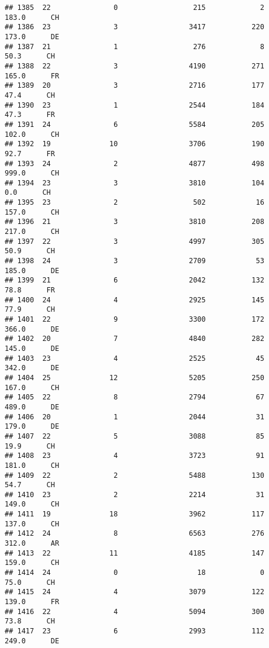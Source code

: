 \documentclass[
]{article}
\begin{document}
\begin{verbatim}
## 1385  22               0                  215             2    183.0      CH
## 1386  23               3                 3417           220    173.0      DE
## 1387  21               1                  276             8     50.3      CH
## 1388  22               3                 4190           271    165.0      FR
## 1389  20               3                 2716           177     47.4      CH
## 1390  23               1                 2544           184     47.3      FR
## 1391  24               6                 5584           205    102.0      CH
## 1392  19              10                 3706           190     92.7      FR
## 1393  24               2                 4877           498    999.0      CH
## 1394  23               3                 3810           104      0.0      CH
## 1395  23               2                  502            16    157.0      CH
## 1396  21               3                 3810           208    217.0      CH
## 1397  22               3                 4997           305     50.9      CH
## 1398  24               3                 2709            53    185.0      DE
## 1399  21               6                 2042           132     78.8      FR
## 1400  24               4                 2925           145     77.9      CH
## 1401  22               9                 3300           172    366.0      DE
## 1402  20               7                 4840           282    145.0      DE
## 1403  23               4                 2525            45    342.0      DE
## 1404  25              12                 5205           250    167.0      CH
## 1405  22               8                 2794            67    489.0      DE
## 1406  20               1                 2044            31    179.0      DE
## 1407  22               5                 3088            85     19.9      CH
## 1408  23               4                 3723            91    181.0      CH
## 1409  22               2                 5488           130     54.7      CH
## 1410  23               2                 2214            31    149.0      CH
## 1411  19              18                 3962           117    137.0      CH
## 1412  24               8                 6563           276    312.0      AR
## 1413  22              11                 4185           147    159.0      CH
## 1414  24               0                   18             0     75.0      CH
## 1415  24               4                 3079           122    139.0      FR
## 1416  22               4                 5094           300     73.8      CH
## 1417  23               6                 2993           112    249.0      DE

\end{verbatim}
\end{document}
